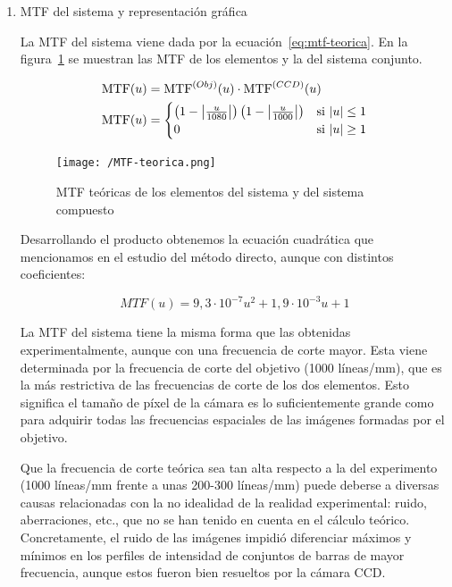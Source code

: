 \documentclass{./packages/optica-article}
\newcommand\MTF{\textrm{MTF}}
\begin{document}
\begin{enumerate}
\begin{enumerate}
		    \item MTF del sistema y representación gráfica

		    La MTF del sistema viene dada por la ecuación~\ref{eq:mtf-teorica}. En la figura~\ref{fig:mtf-teorica} se muestran las MTF de los elementos y la del sistema conjunto.

		    \begin{align}
		        \MTF(u) &= \MTF^{(Obj)}(u) \cdot \MTF^{(CCD)}(u) \\
		        \MTF(u)&= 
		        \begin{cases}
                     \left(1-\abs{\frac{u}{1080}}\right)\left(1-\abs{\frac{u}{1000}}\right)  &\textrm{si   $|u| \leq 1$} \\
                     0   &\textrm{si  $|u| \geq 1$}
                \end{cases}
                 \label{eq:mtf-teorica}
			\end{align}

		    \begin{figure}
		        \centering
		        \texttt{[image: /MTF-teorica.png]}
		        \caption{MTF teóricas de los elementos del sistema y del sistema compuesto}
		        \label{fig:mtf-teorica}
		    \end{figure}

		    Desarrollando el producto obtenemos la ecuación cuadrática que mencionamos en el estudio del método directo, aunque con distintos coeficientes:

		        \begin{equation*}
		        MTF(u) = 9,3 \cdot 10^{-7} u^2 + 1,9 \cdot 10^{-3} u + 1
		        \end{equation*}

		    La MTF del sistema tiene la misma forma que las obtenidas experimentalmente, aunque con una frecuencia de corte mayor. Esta viene determinada por la frecuencia de corte del objetivo (1000 líneas/mm), que es la más restrictiva de las frecuencias de corte de los dos elementos. Esto significa el tamaño de píxel de la cámara es lo suficientemente grande como para adquirir todas las frecuencias espaciales de las imágenes formadas por el objetivo.

		    Que la frecuencia de corte teórica sea tan alta respecto a la del experimento (1000 líneas/mm frente a unas 200-300 líneas/mm) puede deberse a diversas causas relacionadas con la no idealidad de la realidad experimental: ruido, aberraciones, etc., que no se han tenido en cuenta en el cálculo teórico. Concretamente, el ruido de las imágenes impidió diferenciar máximos y mínimos en los perfiles de intensidad de conjuntos de barras de mayor frecuencia, aunque estos fueron bien resueltos por la cámara CCD.

		\end{enumerate}

	\end{enumerate}
\end{document}
